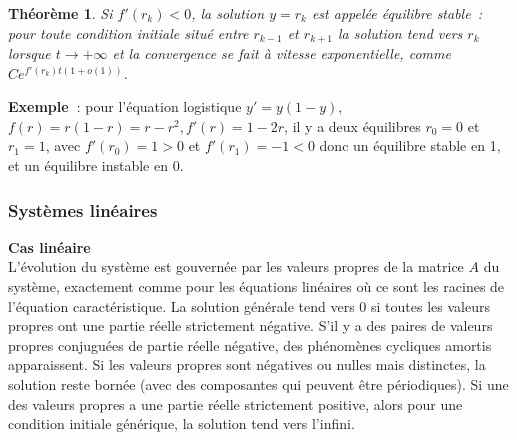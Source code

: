 \documentclass[a4paper,11pt]{article}
\newtheorem{thm}{Théorème}
\begin{document}
\begin{giacjshere}
\begin{thm}
Si $f'(r_k) < 0$, la solution $y=r_k$ est appel\'ee \'equilibre
stable~: pour toute condition initiale situ\'e entre $r_{k-1}$ et $r_{k+1}$
la solution tend vers $r_k$ lorsque $t \rightarrow +\infty$ 
et la convergence se fait \`a vitesse
exponentielle, comme $Ce^{f'(r_k)t(1+o(1))}$.
\end{thm}

{\bf Exemple~}: pour l'\'equation logistique $y'=y(1-y)$,
$f(r)=r(1-r)=r-r^2, f'(r)=1-2r$, 
il y a deux \'equilibres $r_0=0$ et $r_1=1$, avec $f'(r_0)=1>0$
et $f'(r_1)=-1<0$ donc un \'equilibre stable en 1, et un \'equilibre
instable en 0.

\subsubsection{Syst\`emes lin\'eaires}
{\bf Cas lin\'eaire}\\
L'\'evolution du syst\`eme est gouvern\'ee par les valeurs propres
de la matrice $A$ du syst\`eme, exactement comme pour les \'equations
lin\'eaires o\`u ce sont les racines de l'\'equation
caract\'eristique.
La solution g\'en\'erale tend vers 0 si toutes les valeurs propres
ont une partie r\'eelle strictement n\'egative. S'il y a des paires
de valeurs propres conjugu\'ees de partie r\'eelle n\'egative,
des ph\'enom\`enes cycliques amortis apparaissent.
Si les valeurs propres sont n\'egatives ou nulles mais distinctes, la solution
reste born\'ee (avec des composantes qui peuvent \^etre
p\'eriodiques).
Si une des valeurs propres a une partie r\'eelle strictement positive,
alors pour une condition initiale g\'en\'erique, la solution tend vers
l'infini.


\end{giacjshere}
\end{document}
